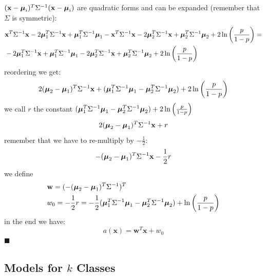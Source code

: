 \documentclass[10pt, letterpaper]{report}
\begin{document}
$(\mathbf x-{\boldsymbol{\mu}}_i)^T\Sigma^{-1}(\mathbf x-{\boldsymbol{\mu}}_i)$ are quadratic forms and can be expanded (remember that $\Sigma$ is symmetric):
\begin{align}
    &\mathbf x^T\Sigma^{-1}\mathbf x-2{\boldsymbol{\mu}}_1^T\Sigma^{-1}\mathbf x+{\boldsymbol{\mu}}_1^T\Sigma^{-1}{\boldsymbol{\mu}}_1
    -
    \mathbf x^T\Sigma^{-1}\mathbf x-2{\boldsymbol{\mu}}_2^T\Sigma^{-1}\mathbf x+{\boldsymbol{\mu}}_2^T\Sigma^{-1}{\boldsymbol{\mu}}_2
    +
    2\ln\left(\frac{p}{1-p}\right)=\\
    &-2{\boldsymbol{\mu}}_1^T\Sigma^{-1}\mathbf x+{\boldsymbol{\mu}}_1^T\Sigma^{-1}{\boldsymbol{\mu}}_1
    -2{\boldsymbol{\mu}}_2^T\Sigma^{-1}\mathbf x+{\boldsymbol{\mu}}_2^T\Sigma^{-1}{\boldsymbol{\mu}}_2
    +
    2\ln\left(\frac{p}{1-p}\right)
\end{align}
reordering we get:\begin{equation}
    2({\boldsymbol{\mu}}_2-{\boldsymbol{\mu}}_1)^T\Sigma^{-1}\mathbf x+({\boldsymbol{\mu}}_1^T\Sigma^{-1}{\boldsymbol{\mu}}_1-{\boldsymbol{\mu}}_2^T\Sigma^{-1}{\boldsymbol{\mu}}_2)+
    2\ln\left(\frac{p}{1-p}\right)
\end{equation}
we call $r$ the constant $({\boldsymbol{\mu}}_1^T\Sigma^{-1}{\boldsymbol{\mu}}_1-{\boldsymbol{\mu}}_2^T\Sigma^{-1}{\boldsymbol{\mu}}_2)+
    2\ln\left(\frac{p}{1-p}\right)$
    \begin{equation}
    2({\boldsymbol{\mu}}_2-{\boldsymbol{\mu}}_1)^T\Sigma^{-1}\mathbf x+r
\end{equation}
remember that we have to re-multiply by $-\frac{1}{2}$:
\begin{equation}
    -({\boldsymbol{\mu}}_2-{\boldsymbol{\mu}}_1)^T\Sigma^{-1}\mathbf x-\frac{1}{2}r
\end{equation}
we define\begin{align}
    &\mathbf w=(-({\boldsymbol{\mu}}_2-{\boldsymbol{\mu}}_1)^T\Sigma^{-1})^T\\ 
    &w_0=-\frac{1}{2}r=-\frac{1}{2} ({\boldsymbol{\mu}}_1^T\Sigma^{-1}{\boldsymbol{\mu}}_1-{\boldsymbol{\mu}}_2^T\Sigma^{-1}{\boldsymbol{\mu}}_2)+
    \ln\left(\frac{p}{1-p}\right)
\end{align}
in the end we have:\begin{equation}
    a(\mathbf x)=\mathbf w^T\mathbf x+w_0
\end{equation}
\hfill$\blacksquare$
\subsection{Models for $k$ Classes}

%
\cite{} %
%
%
\end{document}
